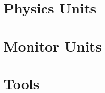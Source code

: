 \documentclass{book}
\begin{document}
\part{Physics Units}






%
%
%

\part{Monitor Units}





%
%
%

%

\part{Tools}\label{Prt:Tools}

\end{document}
